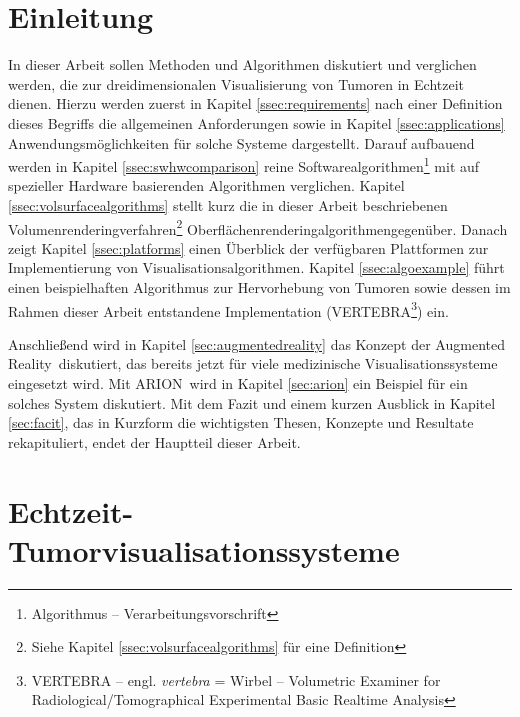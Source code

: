 \documentclass[ngerman,pdftex,paper=A4,DIV=calc,titlepage,12pt]{scrartcl}
\newtheorem[L]{boxedDefinition}{Definition}
\newcommand{\footnoteremember}[2]{\footnote{#2}\newcounter{#1}\setcounter{#1}{\value{footnote}}}
\newcommand{\footnoterecall}[1]{\footnotemark[\value{#1}]}
\begin{document}
\section{Einleitung}\label{sec:introduction}
In dieser Arbeit sollen Methoden und Algorithmen diskutiert und verglichen werden, die zur dreidimensionalen Visualisierung von Tumoren in Echtzeit dienen. Hierzu werden zuerst in Kapitel \vref{ssec:requirements} nach einer Definition dieses Begriffs die allgemeinen Anforderungen sowie in Kapitel \vref{ssec:applications} Anwendungsmöglichkeiten für solche Systeme dargestellt. Darauf aufbauend werden in Kapitel \vref{ssec:swhwcomparison} reine Softwarealgorithmen\footnote{Algorithmus -- Verarbeitungsvorschrift} mit auf spezieller Hardware basierenden Algorithmen verglichen. Kapitel \vref{ssec:volsurfacealgorithms} stellt kurz die in dieser Arbeit beschriebenen Volumenrenderingverfahren\footnoteremember{renderexp}{Siehe Kapitel \ref{ssec:volsurfacealgorithms} für eine Definition} Oberflächenrenderingalgorithmen\footnoterecall{renderexp} gegenüber. Danach zeigt Kapitel \vref{ssec:platforms} einen Überblick der verfügbaren Plattformen zur Implementierung von Visualisationsalgorithmen. Kapitel \vref{ssec:algoexample} führt einen beispielhaften Algorithmus zur Hervorhebung von Tumoren sowie dessen im Rahmen dieser Arbeit entstandene Implementation (\glqq VERTEBRA\footnote{VERTEBRA -- engl. \textit{vertebra} = Wirbel -- Volumetric Examiner for Radiological/Tomographical Experimental Basic Realtime Analysis}\grqq) ein.

Anschließend wird in Kapitel \vref{sec:augmentedreality} das Konzept der \glqq Augmented Reality\grqq\ diskutiert, das bereits jetzt für viele medizinische Visualisationssysteme eingesetzt wird. Mit ARION\texttrademark\  wird in Kapitel \vref{sec:arion} ein Beispiel für ein solches System diskutiert.
Mit dem Fazit und einem kurzen Ausblick in Kapitel \vref{sec:facit}, das in Kurzform die wichtigsten Thesen, Konzepte und Resultate rekapituliert, endet der Hauptteil dieser Arbeit.
\section{Echtzeit-Tumorvisualisationssysteme}\label{sec:vissystems}
\end{document}

